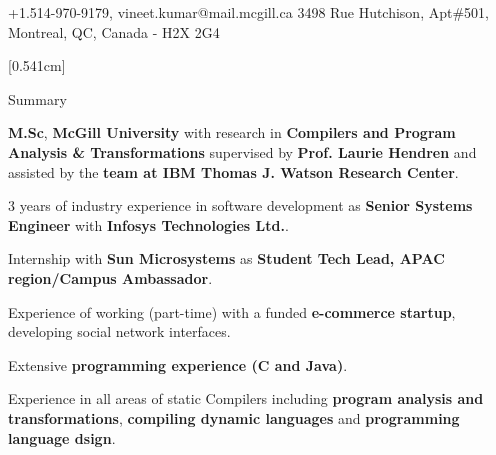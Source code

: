 \documentclass{resume} %
\begin{document}
\begin{hSubsection}{+1.514-970-9179, vineet.kumar@mail.mcgill.ca}
{%
}{3498 Rue Hutchison, Apt\#501, Montreal, QC, Canada - H2X 2G4}
\end{hSubsection}



[0.541cm]
\begin{rSection}{Summary}
\smallskip
\begin{lSubsection}
 \item \textbf{M.Sc}, \textbf{McGill University} with research in \textbf{Compilers and Program Analysis \& Transformations} supervised by \textbf{Prof. Laurie Hendren} and assisted by the \textbf{\xten team at IBM Thomas J. Watson Research Center}.
 \item 3 years of industry experience in software development as \textbf{Senior Systems Engineer} with \textbf{Infosys Technologies Ltd.}.
 \item Internship with \textbf{Sun Microsystems} as \textbf{Student Tech Lead, APAC region/Campus Ambassador}.
 \item Experience of working (part-time) with a funded \textbf{e-commerce startup}, developing social network interfaces.
 \item Extensive \textbf{programming experience (C and Java)}.
 \item Experience in all areas of static Compilers including \textbf{program analysis and transformations}, \textbf{compiling dynamic languages} and \textbf{programming language dsign}.
 
\end{lSubsection}
\end{rSection}
\end{document}
